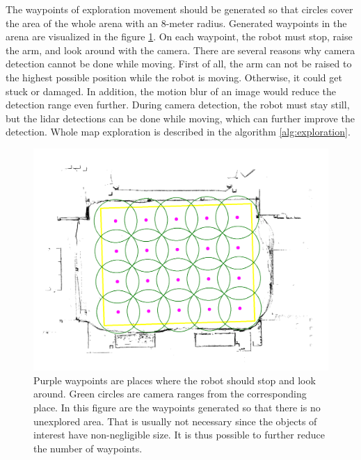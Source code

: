 The waypoints of exploration movement should be generated so that circles cover the area of the whole arena with an 8-meter radius. Generated waypoints in the arena are visualized in the figure \ref{fig:map_annot}. On each waypoint, the robot must stop, raise the arm, and look around with the camera. There are several reasons why camera detection cannot be done while moving. First of all, the arm can not be raised to the highest possible position while the robot is moving. Otherwise, it could get stuck or damaged. In addition, the motion blur of an image would reduce the detection range even further. During camera detection, the robot must stay still, but the lidar detections can be done while moving, which can further improve the detection. Whole map exploration is described in the algorithm \ref{alg:exploration}.

\begin{figure}[H]
	\centering
	\includegraphics[scale=0.25]{fig/map_annotation.png}
	\caption[Generated waypoints]{Purple waypoints are places where the robot should stop and look around. Green circles are camera ranges from the corresponding place. In this figure are the waypoints generated so that there is no unexplored area. That is usually not necessary since the objects of interest have non-negligible size. It is thus possible to further reduce the number of waypoints.}
	\label{fig:map_annot}
\end{figure}

